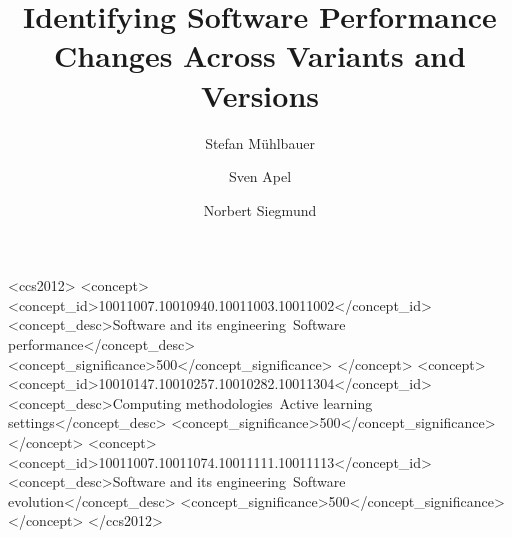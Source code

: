 \documentclass[sigconf]{acmart}
\begin{document}
	\title{Identifying Software Performance Changes Across Variants and Versions}


	\author{Stefan Mühlbauer}

	\author{Sven Apel}

	\author{Norbert Siegmund}

	
	\begin{CCSXML}
		<ccs2012>
		<concept>
		<concept_id>10011007.10010940.10011003.10011002</concept_id>
		<concept_desc>Software and its engineering~Software performance</concept_desc>
		<concept_significance>500</concept_significance>
		</concept>
		<concept>
		<concept_id>10010147.10010257.10010282.10011304</concept_id>
		<concept_desc>Computing methodologies~Active learning settings</concept_desc>
		<concept_significance>500</concept_significance>
		</concept>
		<concept>
		<concept_id>10011007.10011074.10011111.10011113</concept_id>
		<concept_desc>Software and its engineering~Software evolution</concept_desc>
		<concept_significance>500</concept_significance>
		</concept>
		</ccs2012>
	\end{CCSXML}
	
\end{document}
